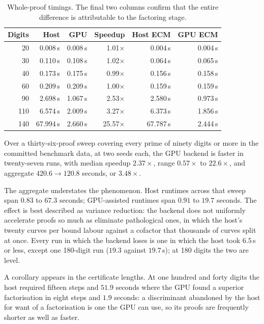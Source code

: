 \documentclass[11pt,a4paper]{article}
\begin{document}
\begin{table}[t]
\centering
\begin{tabular}{rrrrrr}
\toprule
Digits & Host & GPU & Speedup & Host ECM & GPU ECM \\
\midrule
20  & 0.008\,s  & 0.008\,s & 1.01$\times$ & 0.004\,s & 0.004\,s \\
30  & 0.110\,s  & 0.108\,s & 1.02$\times$ & 0.064\,s & 0.065\,s \\
40  & 0.173\,s  & 0.175\,s & 0.99$\times$ & 0.156\,s & 0.158\,s \\
60  & 0.209\,s  & 0.209\,s & 1.00$\times$ & 0.159\,s & 0.159\,s \\
90  & 2.698\,s  & 1.067\,s & 2.53$\times$ & 2.580\,s & 0.973\,s \\
110 & 6.574\,s  & 2.009\,s & 3.27$\times$ & 6.373\,s & 1.856\,s \\
140 & 67.994\,s & 2.660\,s & 25.57$\times$ & 67.787\,s & 2.444\,s \\
\bottomrule
\end{tabular}
\caption{Whole-proof timings. The final two columns confirm that the
  entire difference is attributable to the factoring stage.}
\label{tab:proofs}
\end{table}

Over a thirty-six-proof sweep covering every prime of ninety digits or
more in the committed benchmark data, at two seeds each, the GPU backend
is faster in twenty-seven runs, with median speedup $2.37\times$, range
$0.57\times$ to $22.6\times$, and aggregate $420.6 \to 120.8$ seconds,
or $3.48\times$.

The aggregate understates the phenomenon. Host runtimes across that sweep
span $0.83$ to $67.3$ seconds; GPU-assisted runtimes span $0.91$ to
$19.7$ seconds. The effect is best described as variance reduction: the backend
does not uniformly accelerate proofs so much as eliminate pathological
ones, in which the host's twenty curves per bound labour against a
cofactor that thousands of curves split at once. Every run in which the
backend loses is one in which the host took $6.5$\,s or less, except one 180-digit
run ($19.3$ against $19.7$\,s); at 180 digits the two are level.

A corollary appears in the certificate lengths. At one hundred and forty
digits the host required fifteen steps and $51.9$ seconds where the GPU
found a superior factorisation in eight steps and $1.9$ seconds: a
discriminant abandoned by the host for want of a factorisation is one the
GPU can use, so its proofs are frequently shorter as well as faster.
\end{document}
